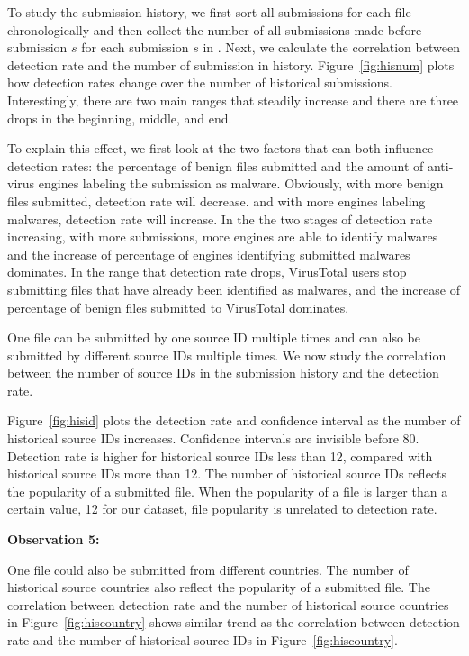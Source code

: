 To study the submission history, we first sort all submissions for each file chronologically
and then collect the number of all submissions made before submission $s$ for each submission $s$ in \vt.
Next, we calculate the correlation between detection rate and the number of submission in history.
Figure~\ref{fig:hisnum} plots how detection rates change over the number of historical submissions.
Interestingly, there are two main ranges that steadily increase and there are three drops in the beginning, middle, and end.

To explain this effect, we first look at the two factors that can both influence detection rates:
the percentage of benign files submitted and the amount of anti-virus engines labeling the submission as malware.
Obviously, with more benign files submitted, detection rate will decrease.   
and with more engines labeling malwares, detection rate will increase. 
In the the two stages of detection rate increasing, 
with more submissions, more engines are able to identify malwares 
and the increase of percentage of engines identifying submitted malwares dominates. 
In the range that detection rate drops, 
VirusTotal users stop submitting files that have already been identified as malwares,
and the increase of percentage of benign files submitted to VirusTotal dominates. 

One file can be submitted by one source ID multiple times 
and can also be submitted by different source IDs multiple times. 
We now study the correlation between the number of source IDs in the submission history and the detection rate. 

Figure~\ref{fig:hisid} plots the detection rate and confidence interval as the number of historical source IDs increases. 
Confidence intervals are invisible before 80. 
Detection rate is higher for historical source IDs less than 12, compared with historical source IDs more than 12.
The number of historical source IDs reflects the popularity of a submitted file.
When the popularity of a file is larger than a certain value, 12 for our dataset, 
file popularity is unrelated to detection rate. 

{\bf Observation 5:} 
{\em }

One file could also be submitted from different countries. 
The number of historical source countries also reflect the popularity of a submitted file. 
The correlation between detection rate and the number of historical source countries in 
Figure~\ref{fig:hiscountry} shows similar trend as the correlation between detection rate 
and the number of historical source IDs in Figure~\ref{fig:hiscountry}. 

